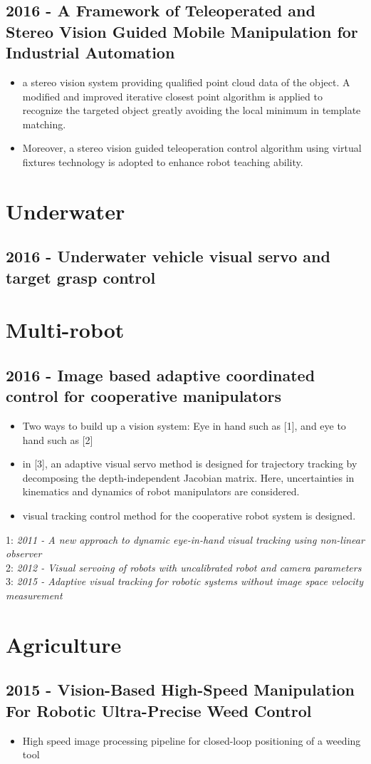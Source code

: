 \subsection{2016 - A Framework of Teleoperated and Stereo Vision Guided Mobile Manipulation for Industrial Automation}
\begin{itemize}
\item  a stereo vision system providing qualified point cloud data of the object. A modified and improved iterative closest point algorithm is applied to recognize the targeted object greatly avoiding the local minimum in template matching.
\item Moreover, a stereo vision guided teleoperation control algorithm using virtual fixtures technology is adopted to enhance robot teaching ability.
\end{itemize}

\section{Underwater}
\subsection{2016 - Underwater vehicle visual servo and target grasp control}


\section{Multi-robot}
\subsection{2016 - Image based adaptive coordinated control for cooperative manipulators}
\begin{itemize}
\item Two ways to build up a vision system: Eye in hand such as [1], and eye to hand such as [2]
\item in [3], an adaptive visual servo method is designed for trajectory tracking by decomposing the depth-independent Jacobian matrix. Here, uncertainties in kinematics and dynamics of robot manipulators are considered. 
\item visual tracking control method for the cooperative robot system is designed. 
\end{itemize}
1: \textit{2011 - A new approach to dynamic eye-in-hand visual tracking using non-linear observer} \\
2: \textit{2012 - Visual servoing of robots with uncalibrated robot and camera parameters} \\
3: \textit{2015 - Adaptive visual tracking for robotic systems without image space velocity measurement}

\section{Agriculture}
\subsection{2015 - Vision-Based High-Speed Manipulation For Robotic Ultra-Precise Weed Control}
\begin{itemize}
\item High speed image processing pipeline for closed-loop positioning of a weeding tool
\end{itemize}